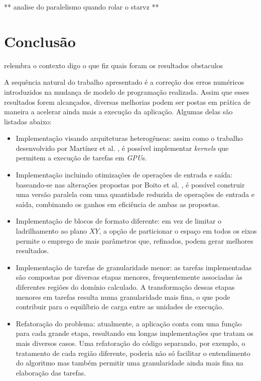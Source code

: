 \documentclass[cic,tc]{iiufrgs}
\begin{document}
** analise do paralelismo quando rolar o starvz **

\chapter{Conclusão}\label{sec:conclusion}

relembra o contexto
digo o que fiz
quais foram os resultados
obstaculos

A sequência natural do trabalho apresentado é a correção dos erros numéricos introduzidos na mudança de modelo de programação realizada. Assim que esses resultados
forem alcançados, diversas melhorias podem ser postas em prática de maneira a acelerar ainda mais a execução da aplicação. Algumas delas são listadas abaixo:

\begin{itemize}
\item{Implementação visando arquiteturas heterogêneas:} assim como o trabalho desenvolvido por Martínez et al. \cite{victor}, é possível implementar \textit{kernels}
  que permitem a execução de tarefas em \textit{GPU}s.
\item{Implementação incluindo otimizações de operações de entrada e saída:} baseando-se nas alterações propostas por Boito et al. \cite{boito}, é possível construir uma versão
  paralela com uma quantidade reduzida de operações de entrada e saída, combinando os ganhos em eficiência de ambas as propostas.
\item{Implementação de blocos de formato diferente:} em vez de limitar o ladrilhamento ao plano $XY$, a opção de particionar o espaço em todos os eixos permite o
  emprego de mais parâmetros que, refinados, podem gerar melhores resultados.
\item{Implementação de tarefas de granularidade menor:} as tarefas implementadas são compostas por diversas etapas menores, frequentemente associadas às diferentes
  regiões do domínio calculado. A transformação dessas etapas menores em tarefas resulta numa granularidade mais fina, o que pode contribuir para o equilíbrio de carga
  entre as unidades de execução.
\item{Refatoração do problema:} atualmente, a aplicação conta com uma função para cada grande etapa, resultando em longas implementações que tratam os mais diversos casos.
  Uma refatoração do código separando, por exemplo, o tratamento de cada região diferente, poderia não só facilitar o entendimento do algoritmo mas também permitir uma
  granularidade ainda mais fina na elaboração das tarefas.
\end{itemize}
\end{document}
